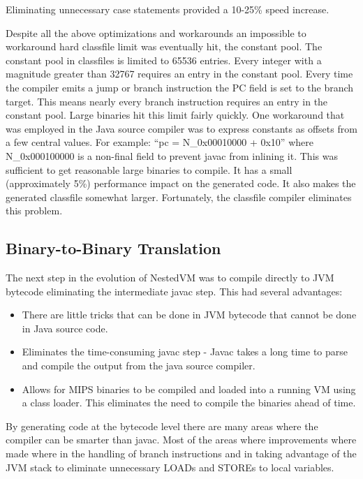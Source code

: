 \documentclass{acmconf}
\begin{document}
Eliminating unnecessary case statements provided a 10-25\% speed
increase.

Despite all the above optimizations and workarounds an impossible to
workaround hard classfile limit was eventually hit, the constant
pool. The constant pool in classfiles is limited to 65536
entries. Every integer with a magnitude greater than 32767 requires an
entry in the constant pool. Every time the compiler emits a
jump or branch instruction the PC field is set to the branch target. This
means nearly every branch instruction requires an entry in the
constant pool. Large binaries hit this limit fairly quickly. One
workaround that was employed in the Java source compiler was to
express constants as offsets from a few central values. For example:
``pc = N\_0x00010000 + 0x10'' where N\_0x000100000 is a non-final
field to prevent javac from inlining it. This was sufficient to get
reasonable large binaries to compile. It has a small (approximately
5\%) performance impact on the generated code. It also makes the
generated classfile somewhat larger.  Fortunately, the classfile
compiler eliminates this problem.


\subsection{Binary-to-Binary Translation}

The next step in the evolution of NestedVM was to compile directly to
JVM bytecode eliminating the intermediate javac step. This had several
advantages:

\begin{itemize}
      
\item There are little tricks that can be done in JVM bytecode that
      cannot be done in Java source code.

\item Eliminates the time-consuming javac step - Javac takes a long
      time to parse and compile the output from the java source
      compiler.

\item Allows for MIPS binaries to be compiled and loaded into a
      running VM using a class loader. This eliminates the need to
      compile the binaries ahead of time.

\end{itemize}

By generating code at the bytecode level there are many areas where
the compiler can be smarter than javac. Most of the areas where
improvements where made where in the handling of branch instructions
and in taking advantage of the JVM stack to eliminate unnecessary
LOADs and STOREs to local variables.
\end{document}
